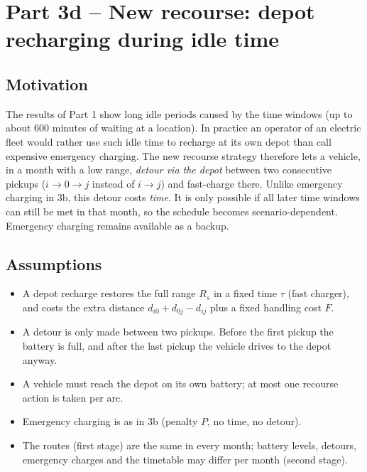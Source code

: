\documentclass[11pt,a4paper]{article}
\theoremstyle{definition}
\begin{document}
\section{Part 3d -- New recourse: depot recharging during idle time}
\subsection{Motivation}
The results of Part 1 show long idle periods caused by the time windows (up to about 600 minutes of waiting at a location). In practice an operator of an electric fleet would rather use such idle time to recharge at its own depot than call expensive emergency charging. The new recourse strategy therefore lets a vehicle, in a month with a low range, \emph{detour via the depot} between two consecutive pickups ($i\to0\to j$ instead of $i\to j$) and fast-charge there. Unlike emergency charging in 3b, this detour costs \emph{time}. It is only possible if all later time windows can still be met in that month, so the schedule becomes scenario-dependent. Emergency charging remains available as a backup.

\subsection{Assumptions}
\begin{itemize}
\item A depot recharge restores the full range $R_s$ in a fixed time $\tau$ (fast charger), and costs the extra distance $d_{i0}+d_{0j}-d_{ij}$ plus a fixed handling cost $F$.
\item A detour is only made between two pickups. Before the first pickup the battery is full, and after the last pickup the vehicle drives to the depot anyway.
\item A vehicle must reach the depot on its own battery; at most one recourse action is taken per arc.
\item Emergency charging is as in 3b (penalty $P$, no time, no detour).
\item The routes (first stage) are the same in every month; battery levels, detours, emergency charges and the timetable may differ per month (second stage).
\end{itemize}
\end{document}
